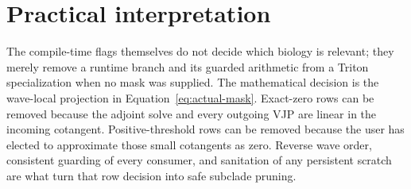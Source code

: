 \documentclass[11pt]{article}
\begin{document}
\normalsize

\section{Practical interpretation}

The compile-time flags themselves do not decide which biology is relevant;
they merely remove a runtime branch and its guarded arithmetic from a Triton
specialization when no mask was supplied.  The mathematical decision is the
wave-local projection in Equation~\eqref{eq:actual-mask}.  Exact-zero rows can
be removed because the adjoint solve and every outgoing VJP are linear in the
incoming cotangent.  Positive-threshold rows can be removed because the user
has elected to approximate those small cotangents as zero.  Reverse wave order,
consistent guarding of every consumer, and sanitation of any persistent
scratch are what turn that row decision into safe subclade pruning.
\end{document}
